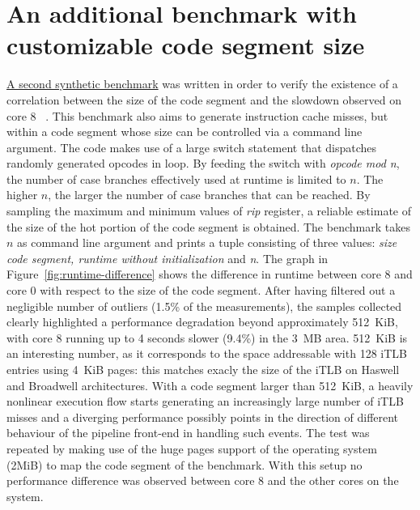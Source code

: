 \documentclass[a4paper]{jpconf}
\begin{document}
\section{An additional benchmark with customizable code segment size}
\label{section:benchmark-itlb}
\href{https://gitlab.cern.ch/snippets/217}{A second synthetic benchmark}
was written in order to verify the existence of a
correlation between the size of the code segment and the slowdown observed on core 8
~\cite{synthetic_benchmark:icache_misses_variable_code_segment}. 
This benchmark also aims to generate instruction cache misses,
but within a code segment whose size can be controlled via a command line
argument. The code makes use of a large switch statement that dispatches
randomly generated opcodes in loop. By feeding the switch with \textit{opcode mod n}, the number of case
branches effectively used at runtime is limited to $n$. The higher $n$, the larger the
number of case branches that can be reached. By sampling the
maximum and minimum values of \textit{rip} register, a reliable estimate of the
size of the hot portion of the code segment is obtained. The
benchmark takes $n$ as command line argument and prints a tuple consisting of
three values: \textit{size code segment, runtime without initialization} and \textit{n}.
The graph in Figure~\ref{fig:runtime-difference} shows the difference in runtime
between core 8 and core 0 with respect to the size of the code segment. After having
filtered out a negligible number of outliers (1.5\% of the measurements),
the samples collected clearly highlighted a performance
degradation beyond approximately 512~KiB, with core 8 running up to 4 seconds slower
(9.4\%) in the 3~MB area. 512~KiB is an interesting number, as it
corresponds to the space addressable with 128 iTLB entries using 4~KiB pages: this
matches exacly the size of the iTLB on Haswell and Broadwell architectures.
With a code segment larger than 512~KiB, a heavily nonlinear execution flow starts generating an increasingly
large number of iTLB misses and a diverging performance possibly points in the direction of different
behaviour of the pipeline front-end in handling such events. The test was repeated 
by making use of the huge pages support of the operating
system (2MiB) to map the code segment of the benchmark. With this setup no 
performance difference was observed between core 8 and the other cores on the system.
\end{document}
